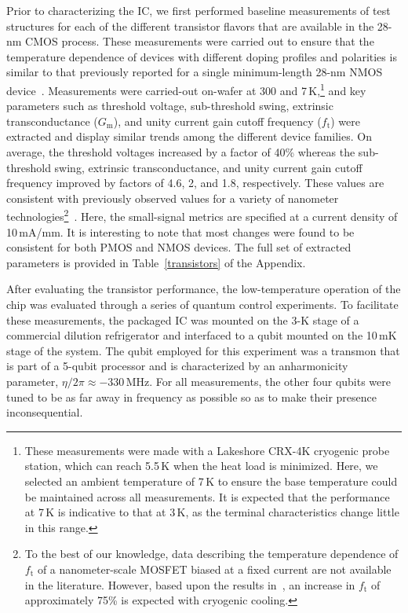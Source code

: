 \documentclass[journal]{IEEEtran}
\newcommand{\CR}[1]{{\color{black}#1}}
\begin{document}
Prior to characterizing the IC, we first performed baseline measurements of test structures for each of the different transistor flavors that are available in the 28-nm CMOS process. These measurements were carried out to ensure that the temperature dependence of devices with different doping profiles and polarities is similar to that previously reported for a single minimum-length 28-nm NMOS device~\cite{beckers2018characterization}. Measurements were carried-out on\CR{-}wafer at 300 and 7\,K,\footnote{\CR{These measurements were made with a Lakeshore CRX-4K cryogenic probe station, which can reach 5.5\,K when the heat load is minimized. Here, we selected an ambient temperature of 7\,K to ensure the base temperature could be maintained across all measurements. It is expected that the performance at 7\,K is indicative to that at 3\,K, as the terminal characteristics change little in this range.}} and key parameters such as threshold voltage, sub-threshold \CR{swing}, extrinsic transconductance ($G_\text{m}$), and unity current gain cutoff frequency ($f_\text{t}$) were extracted and display similar trends among the different device families. On average, the threshold voltages increased by a factor of 40\% whereas the sub-threshold \CR{swing}, extrinsic transconductance, and unity current gain cutoff frequency improved by factors of 4.6, 2, and 1.8, respectively. \CR{These values are consistent with previously observed values for a variety of nanometer technologies\footnote{\CR{To the best of our knowledge, data describing the temperature dependence of $f_\text{t}$ of a nanometer-scale MOSFET biased at a fixed current are not available in the literature. However, based upon the results in~\cite{coskun2014cryogenic}, an increase in $f_\text{t}$ of approximately 75\% is expected with cryogenic cooling.}}~\cite{beckers2018characterization,IEDM_CHARBON,beckers_GM,coskun2014cryogenic}}. Here, the small-signal metrics are specified at a current density of 10\,mA/mm. It is interesting to note that \CR{most} changes \CR{were found to be} consistent for both PMOS and NMOS devices. The full set of extracted parameters is provided in Table~\ref{transistors} of the Appendix. 

After evaluating the transistor performance, the low-temperature operation of the chip was evaluated through a series of quantum control experiments. To facilitate these measurements, the packaged IC was mounted on the 3-K stage of a commercial dilution refrigerator and interfaced to a qubit mounted on the 10\,mK stage of the system. The qubit employed for this experiment was a transmon that is part of a 5-qubit processor and is characterized by an anharmonicity parameter, $\eta/2\pi\approx-330\,$MHz. For all measurements, the other four qubits were tuned to be as far away in frequency as possible so as to make their presence inconsequential.
\end{document}

